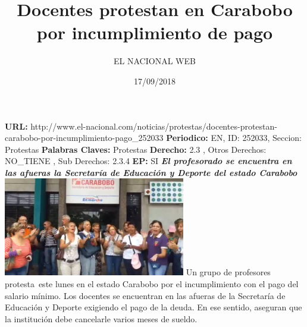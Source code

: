 \documentclass{article}%
\title{\textbf{Docentes protestan en Carabobo por incumplimiento de pago}}%
\author{EL NACIONAL WEB}%
\date{17/09/2018}%
\begin{document}
%
\normalsize%
\maketitle%
\textbf{URL: }%
http://www.el{-}nacional.com/noticias/protestas/docentes{-}protestan{-}carabobo{-}por{-}incumplimiento{-}pago\_252033\newline%
%
\textbf{Periodico: }%
EN, %
ID: %
252033, %
Seccion: %
Protestas\newline%
%
\textbf{Palabras Claves: }%
Protestas\newline%
%
\textbf{Derecho: }%
2.3%
, Otros Derechos: %
NO\_TIENE%
, Sub Derechos: %
2.3.4%
\newline%
%
\textbf{EP: }%
SI\newline%
\newline%
%
\textbf{\textit{El profesorado se encuentra en las afueras la Secretaría de Educación y Deporte del estado Carabobo}}%
\newline%
\newline%
%
\includegraphics[width=300px]{246.jpg}%
\newline%
%
Un grupo de profesores protesta~este lunes en el estado Carabobo por el incumplimiento con el pago del salario mínimo.%
\newline%
%
Los docentes se encuentran en las afueras de la Secretaría de Educación y Deporte exigiendo el pago de la deuda.%
\newline%
%
En ese sentido, aseguran que la institución debe cancelarle varios meses de sueldo.%
\newline%
%
\end{document}
